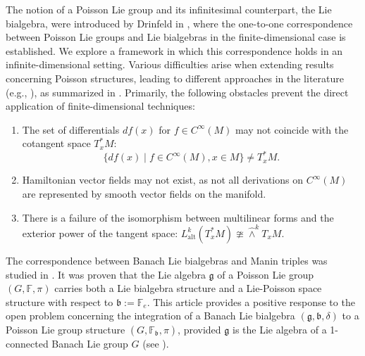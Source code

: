 \documentclass[11pt,reqno]{amsart}
\theoremstyle{definition}
\numberwithin{equation}{section}
\begin{document}
The notion of a Poisson Lie group and its infinitesimal counterpart, the Lie bialgebra, were introduced by Drinfeld in \cite{7}, where the one-to-one correspondence between Poisson Lie groups and Lie bialgebras in the finite-dimensional case is established. We explore a framework in which this correspondence holds in an infinite-dimensional setting. Various difficulties arise when extending results concerning Poisson structures, leading to different approaches in the literature (e.g., \cite{5, 26, 32}), as summarized in \cite{15}. Primarily, the following obstacles prevent the direct application of finite-dimensional techniques:
\begin{enumerate}
    \item The set of differentials $df(x)$ for $f \in C^{\infty}(M)$ may not coincide with the cotangent space $T_{x}^*M$:
    \[
    \{df(x) \mid f \in C^{\infty}(M), x \in M\} \neq T_{x}^*M.
    \]
    \item Hamiltonian vector fields may not exist, as not all derivations on $C^{\infty}(M)$ are represented by smooth vector fields on the manifold.
    \item There is a failure of the isomorphism between multilinear forms and the exterior power of the tangent space: $L_{\text{alt}}^{k}(T_{x}^*M) \ncong \hat{\wedge}^{k}T_{x}M$.
\end{enumerate}

The correspondence between Banach Lie bialgebras and Manin triples was studied in \cite{32}. It was proven that the Lie algebra $\mathfrak{g}$ of a Poisson Lie group $(G, \mathbb{F}, \pi)$ carries both a Lie bialgebra structure and a Lie-Poisson space structure with respect to $\mathfrak{b} := \mathbb{F}_{e}$. This article provides a positive response to the open problem concerning the integration of a Banach Lie bialgebra $(\mathfrak{g}, \mathfrak{b}, \delta)$ to a Poisson Lie group structure $(G, \mathbb{F}_{\mathfrak{b}}, \pi)$, provided $\mathfrak{g}$ is the Lie algebra of a 1-connected Banach Lie group $G$ (see \cite[Remark 5.14]{32}).
\end{document}
